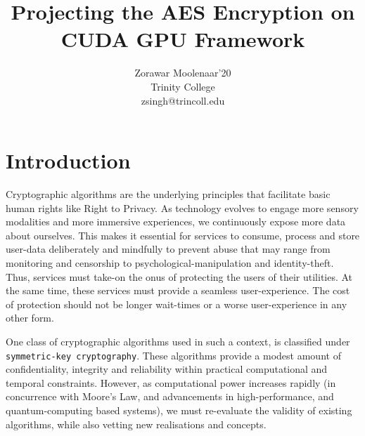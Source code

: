 \documentclass[letterpaper,twocolumn,10pt]{article}
\begin{document}
\date{}

\title{\Large \bf Projecting the AES Encryption on CUDA GPU Framework}

\author{
{\rm Zorawar Moolenaar'20}\\
\rm  Trinity College\\
zsingh@trincoll.edu
}

\maketitle




\section{Introduction}

Cryptographic algorithms are the underlying principles that facilitate basic human rights like Right to Privacy.
As technology evolves to engage more sensory modalities and more immersive experiences, we continuously expose more data about ourselves.
This makes it essential for services to consume, process and store user-data deliberately and mindfully to prevent abuse that may range from monitoring and censorship to psychological-manipulation and identity-theft.
Thus, services must take-on the onus of protecting the users of their utilities.
At the same time, these services must provide a seamless user-experience. The cost of protection should not be longer wait-times or a worse user-experience in any other form.

One class of cryptographic algorithms used in such a context, is classified under \texttt{symmetric-key cryptography}.
These algorithms provide a modest amount of confidentiality, integrity and reliability within practical computational and temporal constraints.
However, as computational power increases rapidly (in concurrence with Moore's Law, and advancements in high-performance, and quantum-computing based systems), we must re-evaluate the validity of existing algorithms, while also vetting new realisations and concepts.
\end{document}
